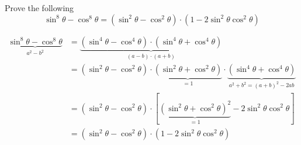 

\question[3] Prove the following 
  \[\sin^8\theta - \cos^8\theta = (\sin^2\theta - \cos^2\theta)\cdot(1-2\sin^2\theta\cos^2\theta)\]


\ifprintanswers
\fi 

\begin{solution}[\halfpage]
   \begin{align}
      \underbrace{\sin^8\theta - \cos^8\theta}_{a^2-b^2} &= 
      \underbrace{(\sin^4\theta - \cos^4\theta)\cdot(\sin^4\theta + \cos^4\theta)}_{(a-b)\cdot(a+b)} \\
      &= (\sin^2\theta - \cos^2\theta)\cdot\underbrace{(\sin^2\theta + \cos^2\theta)}_{=1}\cdot
         \underbrace{(\sin^4\theta + \cos^4\theta)}_{a^2+b^2 = (a+b)^2 - 2ab} \\
      &= (\sin^2\theta - \cos^2\theta)\cdot\left[\underbrace{(\sin^2\theta + \cos^2\theta)^2}_{=1} -
         2\sin^2\theta\cos^2\theta\right] \\
      &= (\sin^2\theta - \cos^2\theta)\cdot(1-2\sin^2\theta\cos^2\theta)
   \end{align}
\end{solution}
